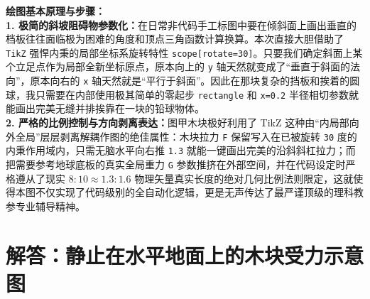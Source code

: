 {\small\color{blue!70!black}
\textbf{绘图基本原理与步骤：}\\
\textbf{1. 极简的斜坡阻碍物参数化：}在日常非代码手工标图中要在倾斜面上画出垂直的档板往往面临极为困难的角度和顶点三角函数计算换算。本次直接大胆借助了 \texttt{TikZ} 强悍内秉的局部坐标系旋转特性 \texttt{scope[rotate=30]}。只要我们确定斜面上某个立足点作为局部全新坐标原点，原本向上的 \texttt{y} 轴天然就变成了“垂直于斜面的法向”，原本向右的 \texttt{x} 轴天然就是“平行于斜面”。因此在那块复杂的挡板和挨着的圆球，我只需要在内部使用极其简单的零起步 \texttt{rectangle} 和 \texttt{x=0.2} 半径相切参数就能画出完美无缝并排挨靠在一块的铅球物体。\\
\textbf{2. 严格的比例控制与方向剥离表达：}图甲木块极好利用了 TikZ 这种由“内局部向外全局”层层剥离解耦作图的绝佳属性：木块拉力 \texttt{F} 保留写入在已被旋转 \texttt{30} 度的内秉作用域内，只需无脑水平向右推 \texttt{1.3} 就能一键画出完美的沿斜斜杠拉力；而把需要参考地球底板的真实全局重力 \texttt{G} 参数推挤在外部空间，并在代码设定时严格遵从了现实 $8:10 \approx 1.3:1.6$ 物理矢量真实长度的绝对几何比例法则限定，这就使得本图不仅实现了代码级别的全自动化逻辑，更是无声传达了最严谨顶级的理科教参专业辅导精神。
}



\section{解答：静止在水平地面上的木块受力示意图}

\vspace{0.6cm}

\begin{center}
\end{center}

